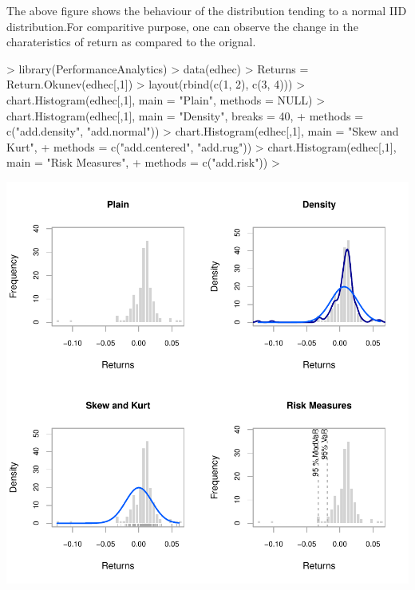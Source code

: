 \documentclass[12pt,letterpaper,english]{article}
\begin{document}
The above figure shows the behaviour of the distribution tending to a normal IID distribution.For comparitive purpose, one can observe the change in the charateristics of return as compared to the orignal.
\begin{Schunk}
\begin{Sinput}
> library(PerformanceAnalytics)
> data(edhec)
> Returns = Return.Okunev(edhec[,1])
> layout(rbind(c(1, 2), c(3, 4)))
>  chart.Histogram(edhec[,1], main = "Plain", methods = NULL)
>  chart.Histogram(edhec[,1], main = "Density", breaks = 40,
+  methods = c("add.density", "add.normal"))
>  chart.Histogram(edhec[,1], main = "Skew and Kurt",
+  methods = c("add.centered", "add.rug"))
> chart.Histogram(edhec[,1], main = "Risk Measures",
+  methods = c("add.risk"))
> 
\end{Sinput}
\end{Schunk}
\includegraphics{OkunevWhite-Graph1}
\end{document}
